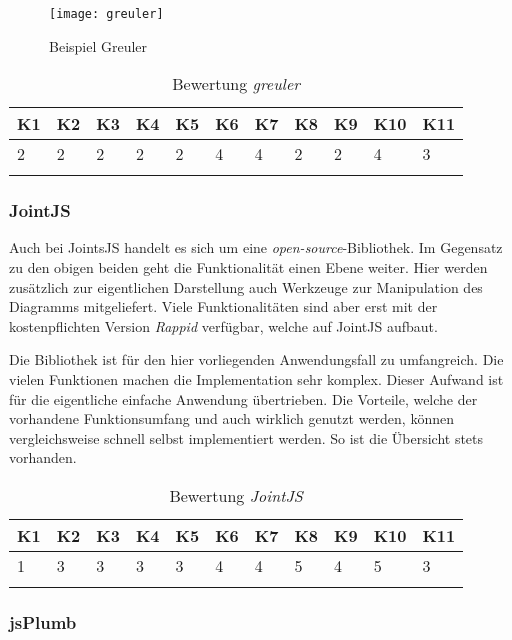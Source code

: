 \begin{figure}[htbp]
\centering
\texttt{[image: greuler]}
\caption{Beispiel Greuler}
\label{fig:bsp-greuler}
\end{figure}

\begin{longtable}{|p{0.5cm}|p{0.5cm}|p{0.5cm}|p{0.5cm}|p{0.5cm}|p{0.5cm}|p{0.5cm}|p{0.5cm}|p{0.5cm}|p{0.7cm}|p{0.7cm}|}
  \hline
    K1 & K2 & K3 & K4 & K5 & K6 & K7 & K8 & K9 & K10 & K11 \\\hline
    2 & 2 & 2 & 2 & 2 & 4 & 4 & 2 & 2 & 4 & 3\\\hline
    \caption{Bewertung \textit{greuler}}
  \label{tab:bewertung-greuler}
\end{longtable}

\subsubsection{JointJS}
Auch bei JointsJS handelt es sich um eine \textit{open-source}-Bibliothek. Im Gegensatz zu den obigen beiden geht die Funktionalität einen Ebene weiter. Hier werden zusätzlich zur eigentlichen Darstellung auch Werkzeuge zur Manipulation des Diagramms mitgeliefert. Viele Funktionalitäten sind aber erst mit der kostenpflichten Version \textit{Rappid} ver\-füg\-bar, welche auf JointJS aufbaut. \cite{jointsjs}

Die Bibliothek ist für den hier vorliegenden Anwendungsfall zu umfangreich. Die vielen Funktionen machen die Implementation sehr komplex. Dieser Aufwand ist für die eigentliche einfache Anwendung übertrieben. Die Vorteile, welche der vorhandene Funktionsumfang und auch wirklich genutzt werden, können vergleichsweise schnell selbst implementiert werden. So ist die Übersicht stets vorhanden.

\begin{longtable}{|p{0.5cm}|p{0.5cm}|p{0.5cm}|p{0.5cm}|p{0.5cm}|p{0.5cm}|p{0.5cm}|p{0.5cm}|p{0.5cm}|p{0.7cm}|p{0.7cm}|}
  \hline
    K1 & K2 & K3 & K4 & K5 & K6 & K7 & K8 & K9 & K10 & K11 \\\hline
    1 & 3 & 3 & 3 & 3 & 4 & 4 & 5 & 4 & 5 & 3\\\hline
    \caption{Bewertung \textit{JointJS}}
  \label{tab:bewertung-jointjs}
\end{longtable}

\subsubsection{jsPlumb}

